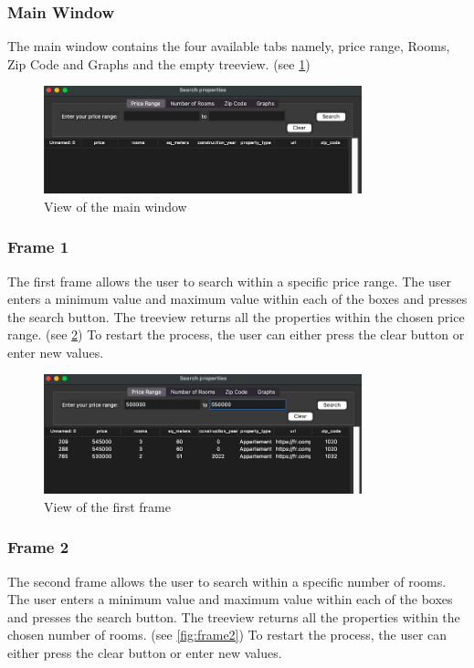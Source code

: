 \documentclass[main]{subfiles}
\begin{document}
\subsubsection{Main Window}
The main window contains the four available tabs namely, price range, Rooms, 
Zip Code and Graphs and the empty treeview. (see \ref{fig:Main_Window})

\begin{figure}[htbp]
    \centerline{
        \includegraphics[width = 92mm]{prog_7.png}}
    \caption{View of the main window}
    \label{fig:Main_Window}
\end{figure}

\subsubsection{Frame 1}
The first frame allows the user to search within a specific price range. 
The user enters a minimum value and maximum value within each of the boxes and presses the search button. 
The treeview returns all the properties within the chosen price range. (see \ref{fig:frame1})
To restart the process, the user can either press the clear button or enter new values.

\begin{figure}[htbp]
    \centerline{
        \includegraphics[width = 92mm]{prog_8.png}}
    \caption{View of the first frame}
    \label{fig:frame1}
\end{figure}

\subsubsection{Frame 2}
The second frame allows the user to search within a specific number of rooms. 
The user enters a minimum value and maximum value within each of the boxes and presses the search button. 
The treeview returns all the properties within the chosen number of rooms. (see \ref{fig:frame2})
To restart the process, the user can either press the clear button or enter new values.
\end{document}
